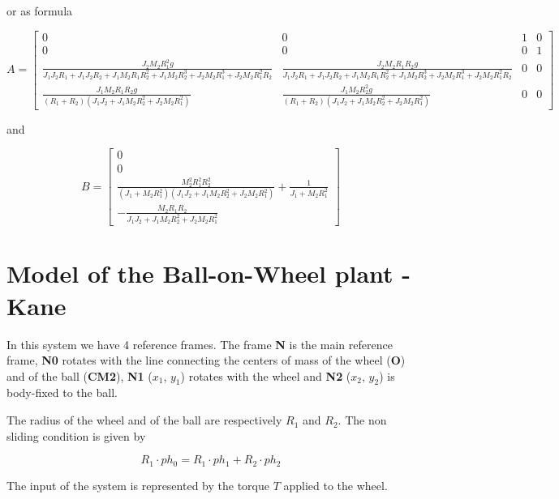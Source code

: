 or as formula

$$
A=\left[\begin{smallmatrix}0 & 0 & 1 & 0\\0 & 0 & 0 & 1\\\frac{J_{2} M_{2} 
R_{1}^{2} g}{J_{1} J_{2} R_{1} + J_{1} J_{2} R_{2} + J_{1} M_{2} R_{1} 
R_{2}^{2} + J_{1} M_{2} R_{2}^{3} + J_{2} M_{2} R_{1}^{3} + J_{2} M_{2} 
R_{1}^{2} R_{2}} & \frac{J_{2} M_{2} R_{1} R_{2} g}{J_{1} J_{2} R_{1} + J_{1} 
J_{2} R_{2} + J_{1} M_{2} R_{1} R_{2}^{2} + J_{1} M_{2} R_{2}^{3} + J_{2} M_{2} 
R_{1}^{3} + J_{2} M_{2} R_{1}^{2} R_{2}} & 0 & 0\\\frac{J_{1} M_{2} R_{1} R_{2} 
g}{\left(R_{1} + R_{2}\right) \left(J_{1} J_{2} + J_{1} M_{2} R_{2}^{2} + J_{2} 
M_{2} R_{1}^{2}\right)} & \frac{J_{1} M_{2} R_{2}^{2} g}{\left(R_{1} + 
R_{2}\right) \left(J_{1} J_{2} + J_{1} M_{2} R_{2}^{2} + J_{2} M_{2} 
R_{1}^{2}\right)} & 0 & 0\end{smallmatrix}\right]
$$

and

$$
B=\left[\begin{smallmatrix}0\\0\\\frac{M_{2}^{2} R_{1}^{2} 
R_{2}^{2}}{\left(J_{1} + M_{2} R_{1}^{2}\right) \left(J_{1} J_{2} + J_{1} M_{2} 
R_{2}^{2} + J_{2} M_{2} R_{1}^{2}\right)} + \frac{1}{J_{1} + M_{2} 
R_{1}^{2}}\\- \frac{M_{2} R_{1} R_{2}}{J_{1} J_{2} + J_{1} M_{2} R_{2}^{2} + 
J_{2} M_{2} R_{1}^{2}}\end{smallmatrix}\right]
$$

\section{Model of the Ball-on-Wheel plant - Kane}

In this system we have 4 reference frames. The frame \textbf{N} is the main 
reference frame, \textbf{N0} rotates with the line connecting the centers of 
mass of the wheel (\textbf{O}) and of the ball (\textbf{CM2}), \textbf{N1} 
($x_1$, $y_1$) rotates with the wheel and \textbf{N2} ($x_2$, $y_2$) is 
body-fixed to the ball.

The radius of the wheel and of the ball are respectively $R_1$ and $R_2$. The 
non sliding condition is given by

$$
R_1 \cdot ph_0=R_1 \cdot ph_1 + R_2 \cdot ph_2
$$

The input of the system is represented by the torque $T$ applied to the wheel.

